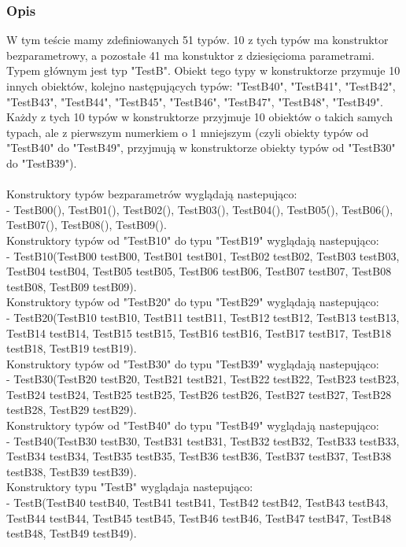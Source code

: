 \documentclass[12pt]{article}
\begin{document}
\subsubsection{Opis}
W tym teście mamy zdefiniowanych 51 typów. 10 z tych typów ma konstruktor bezparametrowy, a pozostałe 41 ma konstuktor z dziesięcioma parametrami. Typem głównym jest typ "TestB". Obiekt tego typy w konstruktorze przymuje 10 innych obiektów, kolejno następujących typów: "TestB40", "TestB41", "TestB42", "TestB43", "TestB44", "TestB45", "TestB46", "TestB47", "TestB48", "TestB49". Każdy z tych 10 typów w konstruktorze przyjmuje 10 obiektów o takich samych typach, ale z pierwszym numerkiem o 1 mniejszym (czyli obiekty typów od "TestB40" do "TestB49", przyjmują w konstruktorze obiekty typów od "TestB30" do "TestB39").\\
\\
Konstruktory typów bezparametrów wyglądają nastepująco:\\
- TestB00(), TestB01(),  TestB02(), TestB03(), TestB04(), TestB05(), TestB06(), TestB07(), TestB08(), TestB09().\\
Konstruktory typów od "TestB10" do typu "TestB19" wyglądają nastepująco:\\
- TestB10(TestB00 testB00, TestB01 testB01, TestB02 testB02, TestB03 testB03, TestB04 testB04, TestB05 testB05, TestB06 testB06, TestB07 testB07, TestB08 testB08, TestB09 testB09).\\
Konstruktory typów od "TestB20" do typu "TestB29" wyglądają nastepująco:\\
- TestB20(TestB10 testB10, TestB11 testB11, TestB12 testB12, TestB13 testB13, TestB14 testB14, TestB15 testB15, TestB16 testB16, TestB17 testB17, TestB18 testB18, TestB19 testB19).\\
Konstruktory typów od "TestB30" do typu "TestB39" wyglądają nastepująco:\\
- TestB30(TestB20 testB20, TestB21 testB21, TestB22 testB22, TestB23 testB23, TestB24 testB24, TestB25 testB25, TestB26 testB26, TestB27 testB27, TestB28 testB28, TestB29 testB29).\\
Konstruktory typów od "TestB40" do typu "TestB49" wyglądają nastepująco:\\
- TestB40(TestB30 testB30, TestB31 testB31, TestB32 testB32, TestB33 testB33, TestB34 testB34, TestB35 testB35, TestB36 testB36, TestB37 testB37, TestB38 testB38, TestB39 testB39).\\
Konstruktory typu "TestB" wyglądaja nastepująco:\\
- TestB(TestB40 testB40, TestB41 testB41, TestB42 testB42, TestB43 testB43, TestB44 testB44, TestB45 testB45, TestB46 testB46, TestB47 testB47, TestB48 testB48, TestB49 testB49).\\
\end{document}
